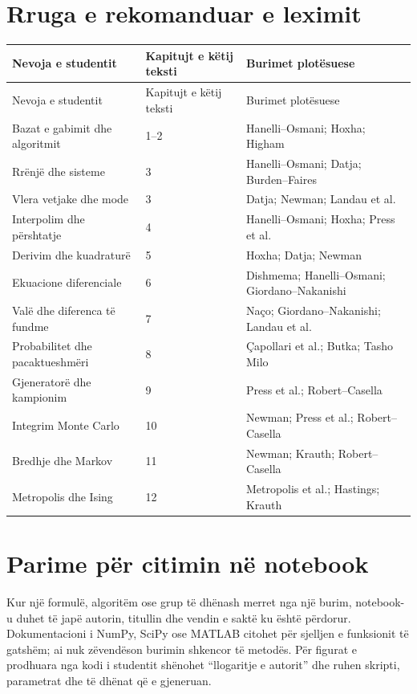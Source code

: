 \documentclass[11pt,oneside,openany]{book}
\begin{document}
\section{Rruga e rekomanduar e leximit}
\begin{longtable}{p{}p{}p{}}
\toprule
Nevoja e studentit & Kapitujt e këtij teksti & Burimet plotësuese\\ \midrule
\endfirsthead
\toprule Nevoja e studentit & Kapitujt e këtij teksti & Burimet plotësuese\\ \midrule\endhead
Bazat e gabimit dhe algoritmit & 1--2 & Hanelli--Osmani; Hoxha; Higham\\
Rrënjë dhe sisteme & 3 & Hanelli--Osmani; Datja; Burden--Faires\\
Vlera vetjake dhe mode & 3 & Datja; Newman; Landau et al.\\
Interpolim dhe përshtatje & 4 & Hanelli--Osmani; Hoxha; Press et al.\\
Derivim dhe kuadraturë & 5 & Hoxha; Datja; Newman\\
Ekuacione diferenciale & 6 & Dishmema; Hanelli--Osmani; Giordano--Nakanishi\\
Valë dhe diferenca të fundme & 7 & Naço; Giordano--Nakanishi; Landau et al.\\
Probabilitet dhe pacaktueshmëri & 8 & Çapollari et al.; Butka; Tasho Milo\\
Gjeneratorë dhe kampionim & 9 & Press et al.; Robert--Casella\\
Integrim Monte Carlo & 10 & Newman; Press et al.; Robert--Casella\\
Bredhje dhe Markov & 11 & Newman; Krauth; Robert--Casella\\
Metropolis dhe Ising & 12 & Metropolis et al.; Hastings; Krauth\\
\bottomrule
\end{longtable}

\section{Parime për citimin në notebook}
Kur një formulë, algoritëm ose grup të dhënash merret nga një burim, notebook-u duhet të japë autorin, titullin dhe vendin e saktë ku është përdorur. Dokumentacioni i NumPy, SciPy ose MATLAB citohet për sjelljen e funksionit të gatshëm; ai nuk zëvendëson burimin shkencor të metodës. Për figurat e prodhuara nga kodi i studentit shënohet ``llogaritje e autorit'' dhe ruhen skripti, parametrat dhe të dhënat që e gjeneruan.
\end{document}

